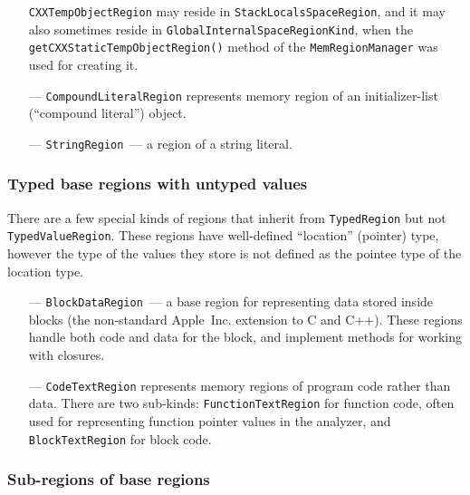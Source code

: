 \documentclass[a4paper,12pt]{article}
\begin{document}
\begin{itemize}
\lstinline|CXXTempObjectRegion| may reside in \lstinline|StackLocalsSpaceRegion|, and it may also sometimes reside in \lstinline|GlobalInternalSpaceRegionKind|, when the \lstinline|getCXXStaticTempObjectRegion()| method of the \lstinline|MemRegionManager| was used for creating it.

\item[---]\lstinline|CompoundLiteralRegion| represents memory region of an initializer-list (``compound literal'') object.
\item[---]\lstinline|StringRegion|~--- a region of a string literal.
\end{itemize}

\subsubsection{Typed base regions with untyped values}

There are a few special kinds of regions that inherit from \lstinline|TypedRegion| but not \lstinline|TypedValueRegion|. These regions have well-defined ``location'' (pointer) type, however the type of the values they store is not defined as the pointee type of the location type.

\begin{itemize}
\item[---] \lstinline|BlockDataRegion|~--- a base region for representing data stored inside blocks (the non-standard Apple~Inc. extension to C and C++). These regions handle both code and data for the block, and implement methods for working with closures.
\item[---]\lstinline|CodeTextRegion| represents memory regions of program code rather than data. There are two sub-kinds: \lstinline|FunctionTextRegion| for function code, often used for representing function pointer values in the analyzer, and \lstinline|BlockTextRegion| for block code.
\end{itemize}

\subsubsection{Sub-regions of base regions}
\end{document}
